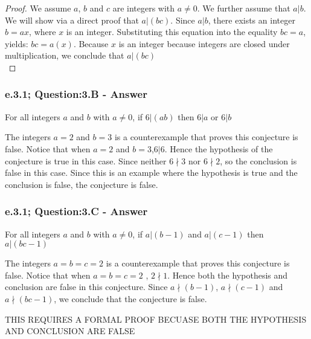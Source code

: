 \begin{proof}
We assume $a$, $b$ and $c$ are integers with $a \neq 0$. We further assume that $a | b$. We will show via a direct proof that $a |(bc)$. Since $a | b$, there exists  an integer $b = ax$, where $x$ is an integer. Substituting this equation into the equality $bc = a$, yields: $bc = a(x)$. Because $x$ is an integer because integers are closed under multiplication, we conclude that $a | (bc)$ \\
\end{proof}


\subsubsection*{e.3.1; Question:3.B - Answer}

\begin{tcolorbox}
	\begin{conjecture}
		For all integers $a$ and $b$ with $a \neq 0$, if $6 |(ab)$ then $6|a$ or $6|b$
	\end{conjecture}
\end{tcolorbox}

The integers $a=2$ and $b=3$ is a counterexample that proves this conjecture is false. Notice that when $a=2$ and $b=3$,$6|6$. Hence the hypothesis of the conjecture is true in this case. Since neither $6 \nmid 3$ nor $6 \nmid 2$, so the conclusion is false in this case. Since this is an example where the hypothesis is true and the conclusion is false, the conjecture is false. 


\subsubsection*{e.3.1; Question:3.C - Answer}

\begin{tcolorbox}
	\begin{conjecture}
		For all integers $a$ and $b$ with $a \neq 0$, if $a |(b-1)$ and $a| (c-1)$ then $a|(bc - 1)$
	\end{conjecture}
\end{tcolorbox}

The integers $a=b=c=2$ is a counterexample that proves this conjecture is false. Notice that when $a=b=c=2$ , $2 \nmid 1$. Hence both the hypothesis and conclusion are false in this conjecture. Since $a \nmid (b-1)$, $a \nmid (c-1)$ and $a \nmid (bc - 1)$, we conclude that the conjecture is false.  

THIS REQUIRES A FORMAL PROOF BECUASE BOTH THE HYPOTHESIS AND CONCLUSION ARE FALSE

